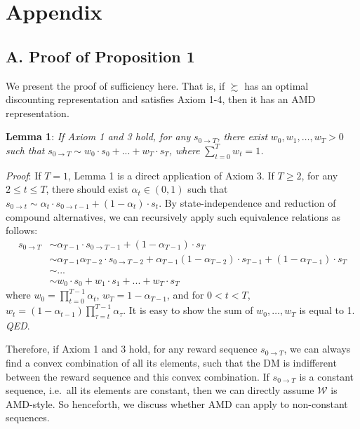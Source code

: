 \documentclass[
  12pt,
]{article}
\begin{document}
\newpage

\hypertarget{appendix}{%
\section*{Appendix}\label{appendix}}

\hypertarget{a.-proof-of-proposition-1}{%
\subsection*{A. Proof of Proposition
1}\label{a.-proof-of-proposition-1}}

We present the proof of sufficiency here. That is, if \(\succsim\) has
an optimal discounting representation and satisfies Axiom 1-4, then it
has an AMD representation.

\noindent \textbf{Lemma 1}: \emph{If Axiom 1 and 3 hold, for any}
\(s_{0\rightarrow T}\)\emph{, there exist} \(w_0, w_1, …, w_T > 0\)
\emph{such that}
\(s_{0\rightarrow T} \sim w_0 \cdot s_0 + ...+w_T\cdot s_T\)\emph{,
where} \(\sum_{t=0}^T w_t=1\)\emph{.}

\noindent \emph{Proof}: If \(T=1\), Lemma 1 is a direct application of
Axiom 3. If \(T\geq 2\), for any \(2\leq t\leq T\), there should exist
\(\alpha_t\in(0,1)\) such that
\(s_{0\rightarrow t}\sim \alpha_t\cdot s_{0\rightarrow t-1}+(1-\alpha_t)\cdot s_{t}\).
By state-independence and reduction of compound alternatives, we can
recursively apply such equivalence relations as follows:\[
\begin{aligned}
s_{0\rightarrow T} &\sim \alpha_{T-1}\cdot s_{0\rightarrow T-1} + (1-\alpha_{T-1})\cdot s_T \\
&\sim  \alpha_{T-1}\alpha_{T-2}\cdot s_{0\rightarrow T-2} + \alpha_{T-1}(1-\alpha_{T-2})\cdot s_{T-1} + (1-\alpha_{T-1})\cdot s_T \\
& \sim ...\\
& \sim w_0 \cdot s_0 + w_1\cdot s_1 +... +w_T\cdot s_T
\end{aligned}
\]where \(w_0=\prod_{t=0}^{T-1}\alpha_t\), \(w_T = 1-\alpha_{T-1}\), and
for \(0<t<T\),
\(w_t=(1-\alpha_{t-1})\prod_{\tau=t}^{T-1}\alpha_{\tau}\). It is easy to
show the sum of \(w_0,…,w_T\) is equal to 1. \emph{QED}.

Therefore, if Axiom 1 and 3 hold, for any reward sequence
\(s_{0\rightarrow T}\), we can always find a convex combination of all
its elements, such that the DM is indifferent between the reward
sequence and this convex combination. If \(s_{0\rightarrow T}\) is a
constant sequence, i.e.~all its elements are constant, then we can
directly assume \(\mathcal{W}\) is AMD-style. So henceforth, we discuss
whether AMD can apply to non-constant sequences.
\end{document}

